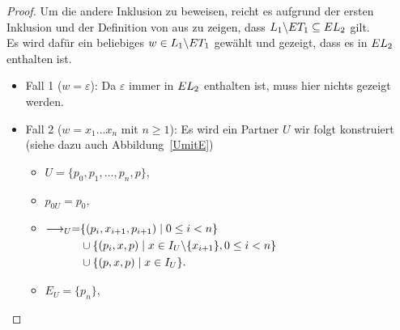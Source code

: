 \begin{proof}
  Um die andere Inklusion zu beweisen, reicht es aufgrund der ersten
  Inklusion und der Definition von \EL{} aus zu zeigen, dass $L_1\backslash ET
  _1\subseteq EL _2$ gilt.\\
  Es wird dafür ein beliebiges $w\in L_1\backslash ET _1$ gewählt und gezeigt,
  dass es in $EL _2$ enthalten ist.
  \begin{itemize}
    \item Fall 1 ($w=\varepsilon$): Da $\varepsilon$ immer in $EL _2$
      enthalten ist, muss hier nichts gezeigt werden.
    \item Fall 2 ($w=x_1\dots x_n$ mit $n\geq 1$): Es wird ein Partner $U$ wir
      folgt konstruiert (siehe dazu auch Abbildung~\ref{UmitE})
      \begin{itemize}
        \item $U=\{p_0,p_1,\dots ,p_n,p\}$,
        \item $p_{0U}=p_0$,
        \item $\begin{aligned}[t]
            \must _U=&\{(p_i,x_{i+1},p_{i+1})\mid 0\leq i< n\}\\
            &\cup\{(p_i,x,p)\mid x\in I_U\backslash\{x_{i+1}\},0\leq i< n\}\\
            &\cup\{(p,x,p)\mid x\in I_U\}.
        \end{aligned}$
        \item $E_U=\{p_n\}$,
      \end{itemize}
      \begin{figure} [h!tbp]
      \begin{center}
\end{center}
\end{figure}
\end{itemize}
\end{proof}
